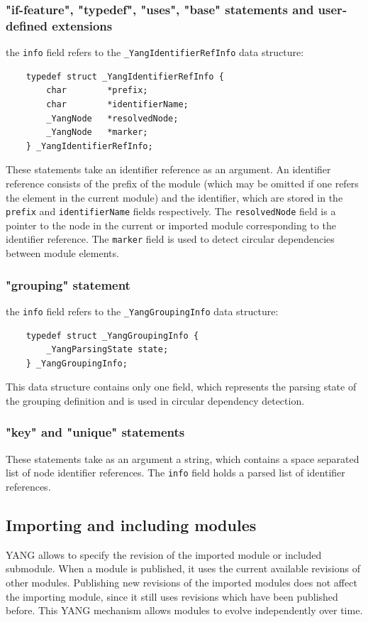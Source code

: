 \documentclass[conference]{IEEEtran}
\begin{document}
\subsubsection{"if-feature", "typedef", "uses", "base" statements and user-defined extensions}
the \texttt{info} field refers to the \texttt{\_YangIdentifierRefInfo} data structure:
\small
\begin{verbatim}
    typedef struct _YangIdentifierRefInfo {
        char        *prefix;
        char        *identifierName;
        _YangNode   *resolvedNode;
        _YangNode   *marker;
    } _YangIdentifierRefInfo;
\end{verbatim}
\normalsize
These statements take an identifier reference as an argument. 
An identifier reference consists of the prefix of the module 
(which may be omitted if one refers the element in the current module) and the identifier,
which are stored in the \texttt{prefix} and \texttt{identifierName} fields respectively. 
The \texttt{resolvedNode} field is a pointer to the node in the current or imported module corresponding to the identifier reference. 
The \texttt{marker} field is used to detect circular dependencies between module elements.

\subsubsection{"grouping" statement}
the \texttt{info} field refers to the \texttt{\_YangGroupingInfo} data structure:
\small
\begin{verbatim}
    typedef struct _YangGroupingInfo {
        _YangParsingState state;
    } _YangGroupingInfo;
\end{verbatim}
\normalsize
This data structure contains only one field, which represents the parsing state of the grouping definition and is used in circular dependency detection.

\subsubsection{"key" and "unique" statements}
These statements take as an argument a string, which contains a space separated list of node identifier references. 
The \texttt{info} field holds a parsed list of identifier references.

\subsection{Importing and including modules}
YANG allows to specify the revision of the imported module or included submodule. When a module is published, it uses the current available revisions of other modules. Publishing new revisions of the imported modules  does not affect the importing module, since it still uses revisions which have been published before. This YANG mechanism allows modules to evolve independently over time. 
\end{document}
